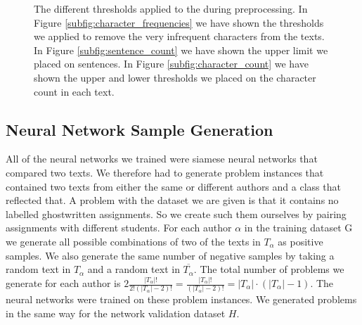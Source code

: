 \begin{figure}[htb]
\begin{minipage}{.5\linewidth}
{        }
    \end{minipage}\par\medskip
    \centering

    \caption{The different thresholds applied to the during preprocessing. In
        Figure \ref{subfig:character_frequencies} we have shown the thresholds
        we applied to remove the very infrequent characters from the texts. In
        Figure \ref{subfig:sentence_count} we have shown the upper limit we
        placed on sentences. In Figure \ref{subfig:character_count} we have
        shown the upper and lower thresholds we placed on the character count in
        each text.
    }
    \label{fig:cutoff_thresholds}
\end{figure}


\subsection{Neural Network Sample Generation} \label{subsec:problem_generation}

All of the neural networks we trained were siamese neural networks that
compared two texts. We therefore had to generate problem instances that
contained two texts from either the same or different authors and a class that
reflected that. A problem with the dataset we are given is that it contains
no labelled ghostwritten assignments. So we create such them ourselves by
pairing assignments with different students. For each author $\alpha$ in the
training dataset \gls{G} we generate all possible combinations of two of the
texts in $T_\alpha$ as positive samples. We also generate the same number
of negative samples by taking a random text in $T_\alpha$ and a random text
in $\overline{T_\alpha}$. The total number of problems we generate for each
author is $2\frac{\left|T_\alpha\right|!}{2!(\left|T_\alpha\right|-2)!}
= \frac{\left|T_\alpha\right|!}{(\left|T_\alpha\right|-2)!} =
\left|T_\alpha\right| \cdot (\left|T_\alpha\right| - 1) $. The neural networks
were trained on these problem instances. We generated problems in the same way
for the network validation dataset $H$.

